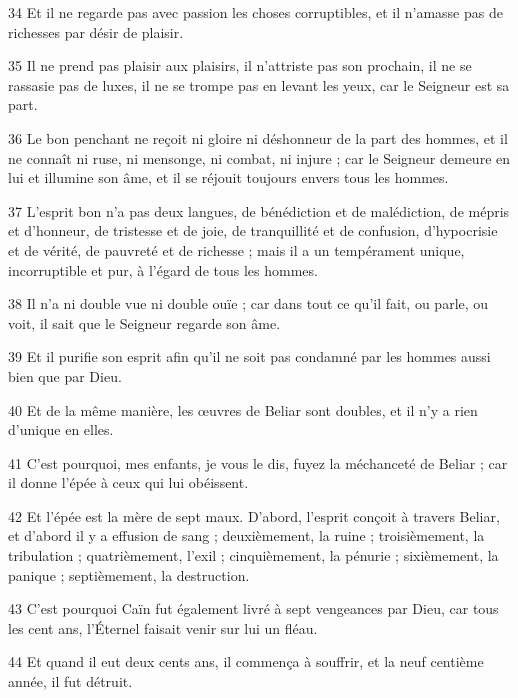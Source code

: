 \par 34 Et il ne regarde pas avec passion les choses corruptibles, et il n'amasse pas de richesses par désir de plaisir.

\par 35 Il ne prend pas plaisir aux plaisirs, il n'attriste pas son prochain, il ne se rassasie pas de luxes, il ne se trompe pas en levant les yeux, car le Seigneur est sa part.

\par 36 Le bon penchant ne reçoit ni gloire ni déshonneur de la part des hommes, et il ne connaît ni ruse, ni mensonge, ni combat, ni injure ; car le Seigneur demeure en lui et illumine son âme, et il se réjouit toujours envers tous les hommes.

\par 37 L'esprit bon n'a pas deux langues, de bénédiction et de malédiction, de mépris et d'honneur, de tristesse et de joie, de tranquillité et de confusion, d'hypocrisie et de vérité, de pauvreté et de richesse ; mais il a un tempérament unique, incorruptible et pur, à l'égard de tous les hommes.

\par 38 Il n'a ni double vue ni double ouïe ; car dans tout ce qu'il fait, ou parle, ou voit, il sait que le Seigneur regarde son âme.

\par 39 Et il purifie son esprit afin qu'il ne soit pas condamné par les hommes aussi bien que par Dieu.

\par 40 Et de la même manière, les œuvres de Beliar sont doubles, et il n'y a rien d'unique en elles.

\par 41 C'est pourquoi, mes enfants, je vous le dis, fuyez la méchanceté de Beliar ; car il donne l'épée à ceux qui lui obéissent.

\par 42 Et l'épée est la mère de sept maux. D’abord, l’esprit conçoit à travers Beliar, et d’abord il y a effusion de sang ; deuxièmement, la ruine ; troisièmement, la tribulation ; quatrièmement, l'exil ; cinquièmement, la pénurie ; sixièmement, la panique ; septièmement, la destruction.

\par 43 C'est pourquoi Caïn fut également livré à sept vengeances par Dieu, car tous les cent ans, l'Éternel faisait venir sur lui un fléau.

\par 44 Et quand il eut deux cents ans, il commença à souffrir, et la neuf centième année, il fut détruit.

